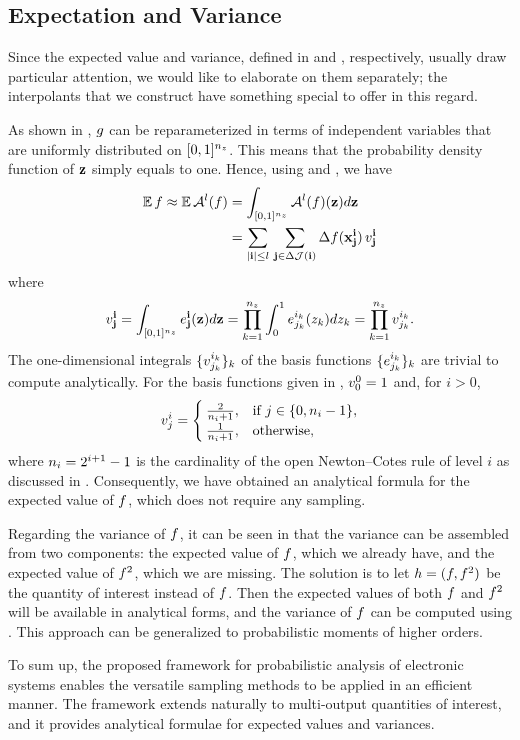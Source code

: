 \subsection{Expectation and Variance}
Since the expected value and variance, defined in  and
, respectively, usually draw particular attention, we would like
to elaborate on them separately; the interpolants that we construct have
something special to offer in this regard.

As shown in , $g$ can be reparameterized in terms of
independent variables that are uniformly distributed on $[0, 1]^{n_z}$. This means
that the probability density function of $\mathbf{z}$ simply equals to one. Hence,
using  and , we have
\begin{align*}
  \mathbb{E} \, f \approx \mathbb{E} \, \mathcal{A}^{l}(f) &= \int_{[0, 1]^{n_z}} \mathcal{A}^{l}(f)(\mathbf{z}) d\mathbf{z} \\
  &= \sum_{|\mathbf{i}| \leq l} \, \sum_{\mathbf{j} \in \Delta\mathcal{J}(\mathbf{i})} \Delta f(\mathbf{x}^{\mathbf{i}}_{\mathbf{j}}) \, v^{\mathbf{i}}_{\mathbf{j}}
\end{align*}
where
\[
  v^{\mathbf{i}}_{\mathbf{j}} = \int_{[0, 1]^{n_z}} e^{\mathbf{i}}_{\mathbf{j}}(\mathbf{z}) d\mathbf{z} = \prod_{k = 1}^{{n_z}} \int_0^1 e^{i_k}_{j_k}(z_k) dz_k = \prod_{k = 1}^{{n_z}} v^{i_k}_{j_k}.
\]
The one-dimensional integrals $\{ v^{i_k}_{j_k} \}_k$ of the basis functions
$\{ e^{i_k}_{j_k} \}_k$ are trivial to compute analytically. For the basis
functions given in , $v^0_0 = 1$ and, for $i > 0$,
\[
  v^i_j = \begin{cases}
    \frac{2}{n_i + 1}, & \text{if } j \in \{ 0, n_i - 1 \}, \\
    \frac{1}{n_i + 1}, & \text{otherwise},
  \end{cases}
\]
where $n_i = 2^{i + 1} - 1$ is the cardinality of the open Newton--Cotes rule
of level $i$ as discussed in . Consequently, we have
obtained an analytical formula for the expected value of $f$, which does not
require any sampling.

Regarding the variance of $f$, it can be seen in  that the
variance can be assembled from two components: the expected value of $f$, which
we already have, and the expected value of $f^2$, which we are missing. The
solution is to let $h = (f, f^2)$ be the quantity of interest instead of $f$.
Then the expected values of both $f$ and $f^2$ will be available in analytical
forms, and the variance of $f$ can be computed using . This
approach can be generalized to probabilistic moments of higher orders.

To sum up, the proposed framework for probabilistic analysis of electronic
systems enables the versatile sampling methods to be applied in an efficient
manner. The framework extends naturally to multi-output quantities of interest,
and it provides analytical formulae for expected values and variances.
